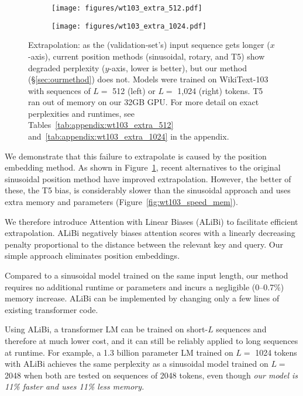 \begin{figure}[h]
\centering
\begin{subfigure}{.5\textwidth}
  \centering
  \texttt{[image: figures/wt103\_extra\_512.pdf]}
\end{subfigure}%
\begin{subfigure}{.5\textwidth}
  \centering
  \texttt{[image: figures/wt103\_extra\_1024.pdf]}
\end{subfigure}
\caption{Extrapolation:
as the (validation-set's) input sequence gets longer ($x$-axis), current position methods (sinusoidal, rotary, and T5) show degraded perplexity ($y$-axis, lower is better), but our method (\S\ref{sec:ourmethod}) does not.  Models were trained on WikiText-103 with sequences of $L=$ 512 (left) or $L=$ 1,024 (right) tokens.  T5 ran out of memory on our 32GB GPU. For more detail on exact perplexities and runtimes, see Tables~\ref{tab:appendix:wt103_extra_512} and~\ref{tab:appendix:wt103_extra_1024} in the appendix.}

\label{fig:wt103_extra}
\end{figure}

We demonstrate that this failure to extrapolate is caused by the position embedding method.  As shown in Figure~\ref{fig:wt103_extra}, recent alternatives to the original sinusoidal position method \citep{roformer,t5} have improved extrapolation.  However, the better of these, the T5 bias, is considerably slower than the sinusoidal approach and uses extra memory and parameters (Figure~\ref{fig:wt103_speed_mem}).

We therefore introduce Attention with Linear Biases (ALiBi) to facilitate  efficient extrapolation. %
ALiBi negatively biases attention scores with a linearly decreasing penalty proportional to the distance between the relevant key and query. Our simple approach eliminates position embeddings. %

Compared to a sinusoidal model trained on the same input length, our method requires no additional runtime or parameters and incurs a negligible (0--0.7\%) memory increase.  ALiBi can be implemented by changing only a few lines of existing transformer code. 

Using ALiBi, a transformer LM can be trained on short-$L$ sequences and therefore at much lower cost, and it can still be reliably applied to long sequences at runtime. For example, a 1.3 billion parameter LM trained on $L=$ 1024 tokens with ALiBi achieves the same perplexity as a sinusoidal model trained on $L=$ 2048 when both are tested on sequences of 2048 tokens, even though \textit{our model is 11\% faster and uses 11\% less memory. }%

